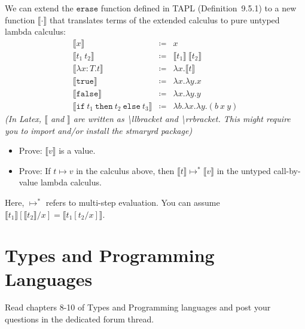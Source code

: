 We can extend the $\mathtt{erase}$ function defined in TAPL (Definition~9.5.1) to a new function $\llbracket\cdot\rrbracket$
that translates terms of the extended calculus to pure untyped lambda calculus: 
\begin{align*}
  \llbracket x \rrbracket &\coloneq & x \\
  \llbracket t_1~t_2 \rrbracket &\coloneq&  \llbracket t_1 \rrbracket~\llbracket t_2 \rrbracket \\
  \llbracket \lambda x:T . t \rrbracket &\coloneq& \lambda x. \llbracket t \rrbracket \\
  \llbracket \mathtt{true}\rrbracket &\coloneq& \lambda{x}.\lambda{y}.x \\
  \llbracket \mathtt{false}\rrbracket &\coloneq& \lambda{x}.\lambda{y}.y \\
  \llbracket \mathtt{if}~t_1~\mathtt{then}~t_2~\mathtt{else}~t_3 \rrbracket &\coloneq& \lambda b.\lambda x.\lambda y.(b\ x\ y)
\end{align*}
\emph{(In Latex, $\llbracket$ and $\rrbracket$ are written as \textbackslash llbracket and \textbackslash rrbracket. 
This might require you to import and/or install the stmaryrd package)}

\begin{itemize}
  \item Prove: $\llbracket v \rrbracket$ is a value.
  \item Prove: If $t \mapsto v$ in the calculus above, then $\llbracket t\rrbracket \mapsto^* \llbracket v\rrbracket$
      in the untyped call-by-value lambda calculus.
\end{itemize}
Here, $\mapsto^*$ refers to multi-step evaluation.
You can assume $\llbracket t_1 \rrbracket [\llbracket t_2\rrbracket /x] = \llbracket t_1[t_2/x]\rrbracket$.

\section{Types and Programming Languages}
Read chapters 8-10 of Types and Programming languages and post your questions in the dedicated forum thread.
